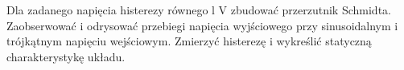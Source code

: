 \section{}
Dla zadanego napięcia histerezy równego l V zbudować przerzutnik Schmidta. 
Zaobserwować i odrysować przebiegi napięcia wyjściowego przy sinusoidalnym i trójkątnym napięciu wejściowym.
Zmierzyć histerezę i wykreślić statyczną charakterystykę układu.
